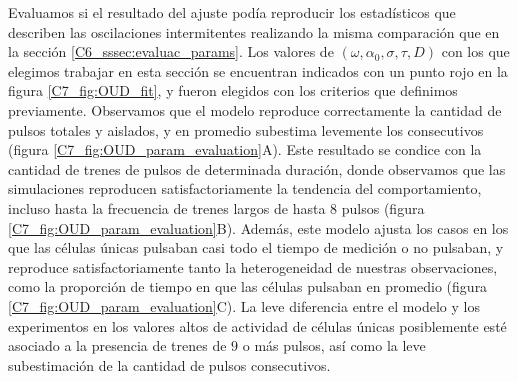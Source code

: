 \documentclass[./main.tex]{subfiles}
\begin{document}
Evaluamos si el resultado del ajuste podía reproducir los estadísticos que describen las oscilaciones intermitentes realizando la misma comparación que en la sección \ref{C6_sssec:evaluac_params}. Los valores de $(\omega,\alpha_0,\sigma,\tau,D)$ con los que elegimos trabajar en esta sección se encuentran indicados con un punto rojo en la figura \ref{C7_fig:OUD_fit}, y fueron elegidos con los criterios que definimos previamente. Observamos que el modelo reproduce correctamente la cantidad de pulsos totales y aislados, y en promedio subestima levemente los consecutivos (figura \ref{C7_fig:OUD_param_evaluation}A). Este resultado se condice con la cantidad de trenes de pulsos de determinada duración, donde observamos que las simulaciones reproducen satisfactoriamente la tendencia del comportamiento, incluso hasta la frecuencia de trenes largos de hasta $8$ pulsos (figura \ref{C7_fig:OUD_param_evaluation}B). Además, este modelo ajusta los casos en los que las células únicas pulsaban casi todo el tiempo de medición o no pulsaban, y reproduce satisfactoriamente tanto la heterogeneidad de nuestras observaciones, como la proporción de tiempo en que las células pulsaban en promedio (figura \ref{C7_fig:OUD_param_evaluation}C). La leve diferencia  entre el modelo y los experimentos en los valores altos de actividad de células únicas posiblemente esté asociado a la presencia de trenes de $9$ o más pulsos, así como la leve subestimación de la cantidad de pulsos consecutivos. 
\end{document}
